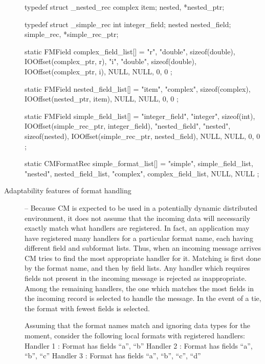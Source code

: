 \documentclass[11pt]{article}
\begin{document}
\begin{description}
\begin{verbatimtab}
	typedef struct _nested_rec {
	    complex item;
	} nested, *nested_ptr;
	
	typedef struct _simple_rec {
	    int integer_field;
	    nested nested_field;
	} simple_rec, *simple_rec_ptr;
	
	static FMField complex_field_list[] =
	{
	    {"r", "double", sizeof(double), IOOffset(complex_ptr, r)},
	    {"i", "double", sizeof(double), IOOffset(complex_ptr, i)},
	    {NULL, NULL, 0, 0}
	};
	
	static FMField nested_field_list[] = 
	{
	    {"item", "complex", sizeof(complex), IOOffset(nested_ptr, item)},
	    {NULL, NULL, 0, 0}
	};
	
	static FMField simple_field_list[] =
	{
	    {"integer_field", "integer",
	     sizeof(int), IOOffset(simple_rec_ptr, integer_field)},
	    {"nested_field", "nested",
	     sizeof(nested), IOOffset(simple_rec_ptr, nested_field)},
	    {NULL, NULL, 0, 0}
	};
	
	static CMFormatRec simple_format_list[] = {
            {"simple", simple_field_list},
	    {"nested", nested_field_list},
	    {"complex", complex_field_list}, 
	    {NULL, NULL}
	};
\end{verbatimtab}

\item[Adaptability features of format handling] -- Because CM is expected to
  be used in a potentially dynamic distributed environment, it does not
  assume that the incoming data will necessarily exactly match what handlers
  are registered.  In fact, an application may have registered
many handlers for a particular format name, each having different field and
subformat lists.  Thus, when an incoming message arrives CM tries to find
the most appropriate handler for it.  Matching is first done by the format
name, and then by field lists.  Any handler which requires fields not
present in the incoming message is rejected as inappropriate.  Among the
remaining handlers, the one which matches the most fields in the incoming
record is selected to handle the message.  In the event of a tie, the format
with fewest fields is selected.

Assuming that the format names match and ignoring data types for the moment,
consider the following local formats with registered handlers:
Handler 1 : Format has fields ``a'', ``b''
Handler 2 : Format has fields ``a'', ``b'', ``c''
Handler 3 : Format has fields ``a'', ``b'', ``c'', ``d''


\end{description}
\end{document}
